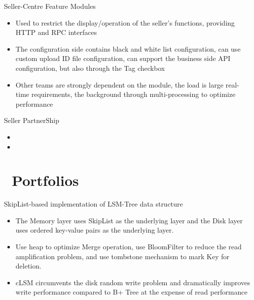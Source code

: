 \documentclass{resume}
\newcommand{\en}[1]{#1}
\newcommand{\zh}[1]{}
\begin{document}
\en{Seller-Centre Feature Modules}
\zh{Seller-Centre Feature 模块}
\begin{itemize}
      \item \en{Used to restrict the display/operation of the seller's functions, providing HTTP and RPC interfaces}
            \zh{用于限制卖家的功能显示/操作,对外提供 HTTP 以及 RPC 查询接口}
      \item \en{The configuration side contains black and white list configuration, can use custom upload ID file configuration, can support the business side API configuration, but also through the Tag checkbox}
            \zh{配置端包含黑白名单配置,支持上传/勾选 Tag/API 等多种方式配置,有回滚/user 端通知/Tag 标记等 Feature}
      \item \en{Other teams are strongly dependent on the module, the load is large real-time requirements, the background through multi-processing to optimize performance}
            \zh{其它团队强依赖模块,负载大实时性要求强,后台通过多协程处理优化性能}
\end{itemize}

\en{Seller PartnerShip}
\zh{Seller PartnerShip}
\begin{itemize}
      \item \en{}
            \zh{项目 owner, 独立完成后端设计与开发,项目需对接多个团队}
      \item \en{}
            \zh{使用 gin 开发,包含充值/兑换/券码/订单/用户等模块,项目功能流程简单,不涉及复杂事务操作}
\end{itemize}

\section{\faGithubAlt\ \en{Portfolios}\zh{个人项目}}
\en{SkipList-based implementation of LSM-Tree data structure}
\zh{基于 SkipList 的 LSM-Tree 数据结构实现}
\begin{itemize}[parsep=0.5ex]
      \item \en{The Memory layer uses SkipList as the underlying layer and the Disk layer uses ordered key-value pairs as the underlying layer.}
            \zh{Memory 层采用 SkipList 作为底层,Disk 层使用有序键值对作为底层}
      \item \en{Use heap to optimize Merge operation, use BloomFilter to reduce the read amplification problem, and use tombstone mechanism to mark Key for deletion.}
            \zh{利用堆优化 Merge 操作,利用 BloomFilter 降低读放大问题,删除采用墓碑机制标记 Key}
      \item \en{cLSM circumvents the disk random write problem and dramatically improves write performance compared to B+ Tree at the expense of read performance}
            \zh{cLSM 规避磁盘随机写入问题,相比 B+ Tree 牺牲读性能,大幅提高写性能}
\end{itemize}
\end{document}
